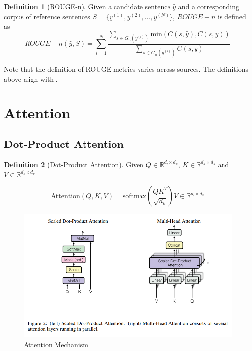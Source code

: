 \documentclass[11pt]{article}
\theoremstyle{definition}
\newtheorem{definition}{Definition}[section]
\begin{document}
\begin{definition}[ROUGE-n] Given a candidate sentence $\hat{y}$ and a corresponding corpus of reference sentences $S = \{ y^{(1)}, y^{(2)}, ..., y^{(N)} \}$, $ROUGE-n$ is defined as
\begin{equation}
ROUGE-n (\hat{y}, S) = \sum_{i=1}^N \frac{ \sum_{s \in G_n(y^{(i)})} \mathrm{min} (C(s,\hat{y}), C(s, y) )}{ \sum_{s \in G_n(y^{(i)})} C(s,y)}
\end{equation}
\end{definition}

Note that the definition of ROUGE metrics varies across sources. The definitions above align with \cite{schluter-2017-limits}.

\section{Attention}


\subsection{Dot-Product Attention}

\begin{definition}[Dot-Product Attention] Given $Q \in \mathbb{R}^{d_l \times d_k}$, $K \in \mathbb{R}^{d_s \times d_k}$ and $V \in \mathbb{R}^{d_s \times d_v}$

\begin{equation}
\mathrm{Attention} \left( Q,K,V \right) = \mathrm{softmax} \left( \frac{QK^T}{\sqrt{d_k}} \right) V \in \mathbb{R}^{d_l \times d_v}
\end{equation}
\end{definition}

\begin{figure}
\centering
  \includegraphics[width=\textwidth,height=\textheight,keepaspectratio]{transformers/attention_mechanism.png}
  \caption{Attention Mechanism \cite{vaswani2017attention}}
  \label{fig:attention}
\end{figure}
\end{document}
